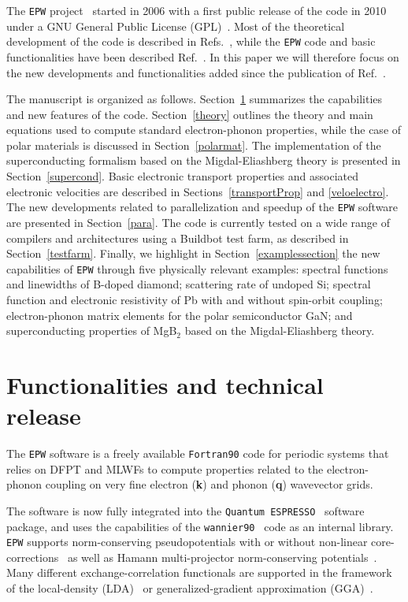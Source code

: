 \documentclass[final,3p,times,twocolumn]{elsarticle}
\begin{document}
The \texttt{EPW} project~\cite{EPWwebsite} started in 2006 with a first public release of the code in 2010 under a GNU General Public License (GPL)~\cite{GNU}. Most of the theoretical development of the code is described in Refs.~\cite{Giustino2007,Margine2013,Verdi2015},
while the \texttt{EPW} code and basic functionalities have been described Ref.~\cite{Noffsinger2010}. In this paper we will therefore focus on the new developments and functionalities added since the publication of Ref.~\cite{Noffsinger2010}. 

The manuscript is organized as follows. Section~\ref{Functionalities} summarizes the capabilities and new features of the code. Section~\ref{theory} outlines the theory and main equations used to compute standard electron-phonon properties, while the case of polar materials is discussed in Section~\ref{polarmat}.
The implementation of the superconducting formalism based on the Migdal-Eliashberg theory is presented in Section~\ref{supercond}.   
Basic electronic transport properties and associated electronic velocities are described in Sections~\ref{transportProp} and \ref{veloelectro}.
The new developments related to parallelization and speedup of the \texttt{EPW} software are presented in Section~\ref{para}.
The code is currently tested on a wide range of compilers and architectures using a Buildbot test farm, as described in Section~\ref{testfarm}.
Finally, we highlight in Section~\ref{examplessection} the new capabilities of \texttt{EPW} through five physically relevant examples: spectral functions and linewidths of B-doped diamond; scattering rate of undoped Si; spectral function and electronic resistivity of Pb with and without spin-orbit coupling; electron-phonon matrix elements for the polar semiconductor GaN; and superconducting properties of MgB$_2$ based on the Migdal-Eliashberg theory.      


\section{Functionalities and technical release}
\label{Functionalities}

The \texttt{EPW} software is a freely available \texttt{Fortran90} code for periodic systems that relies on DFPT and MLWFs to compute properties related to the electron-phonon coupling on very fine electron (\textbf{k}) and phonon (\textbf{q}) wavevector grids. 

The software is now fully integrated into the \texttt{Quantum ESPRESSO}~\cite{Giannozzi2009} software package, and uses the capabilities of the \texttt{wannier90}~\cite{Mostofi2008} code as an internal library. 
\texttt{EPW} supports norm-conserving pseudopotentials with or without non-linear core-corrections~\cite{Perdew1981,Troullier1991,Fuchs1999}
as well as Hamann multi-projector norm-conserving potentials~\cite{Bachelet1982,Hamann2013}.
Many different exchange-correlation functionals are supported in the framework of the local-density (LDA)~\cite{Ceperley1980,Perdew1981} or generalized-gradient approximation (GGA)~\cite{Perdew1992a}.
\end{document}

